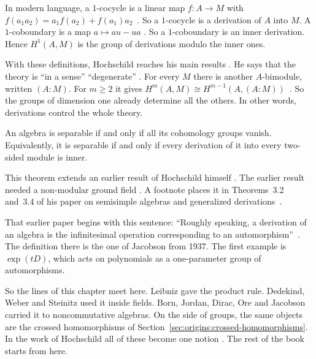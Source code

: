 In modern language, a $1$-cocycle is a linear map $f\colon A \to M$ with
$f(a_1a_2) = a_1 f(a_2) + f(a_1) a_2$~\cite[p.~60,
Definitions~2.2, 2.3]{Hochschild1945}. So a $1$-cocycle is a derivation of $A$
into $M$. A $1$-coboundary is a map $a \mapsto a u - u a$ \cite[p.~60,
Definitions~2.2, 2.3]{Hochschild1945}. So a $1$-coboundary is an inner
derivation. Hence $H^1(A,M)$ is the group of derivations modulo the inner
ones.

With these definitions, Hochschild reaches his main results \cite[Theorem~3.1,
p.~60]{Hochschild1945}. He says that the theory is ``in a sense''
``degenerate'' \cite[Theorem~3.1, p.~60]{Hochschild1945}. For every $M$ there
is another $A$-bimodule, written $(A:M)$. For $m \ge 2$ it gives $H^m(A,M)
\cong H^{m-1}(A, (A:M))$~\cite[Theorem~3.1, p.~60]{Hochschild1945}. So the
groups of dimension one already determine all the others. In other words,
derivations control the whole theory.

\begin{theorem}\label{thm:origins:hochschild-separable}
An algebra is separable if and only if all its cohomology groups vanish.
Equivalently, it is separable if and only if every derivation of it into
every two-sided module is inner.
\end{theorem}

This theorem extends an earlier result of Hochschild himself \cite[p.~58,
footnote~3]{Hochschild1945}. The earlier result needed a non-modular ground
field \cite[p.~58, footnote~3]{Hochschild1945}. A footnote places it in
Theorems~3.2 and~3.4 of his paper on semisimple algebras and generalized
derivations~\cite[p.~58, footnote~3]{Hochschild1945}.

That earlier paper begins with this sentence: ``Roughly speaking, a derivation
of an algebra is the infinitesimal operation corresponding to an
automorphism''~\cite[p.~677]{Hochschild1942}. The definition there is the one
of Jacobson from 1937. The first example is $\exp(tD)$, which acts on
polynomials as a one-parameter group of automorphisms.

So the lines of this chapter meet here. Leibniz gave the product rule.
Dedekind, Weber and Steinitz used it inside fields. Born, Jordan, Dirac, Ore
and Jacobson carried it to noncommutative algebras. On the side of groups, the
same objects are the crossed homomorphisms of
Section~\ref{sec:origins:crossed-homomorphisms}. In the work of Hochschild all
of these become one notion \cite[p.~58]{Hochschild1945}. The rest of the book
starts from here.
